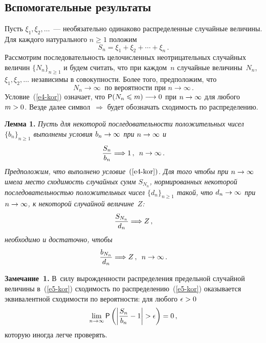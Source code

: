 \begin{multicols}{2}
\subsection{Вспомогательные результаты}

Пусть $\xi_1,\xi_2,\ldots$~--- необязательно одинаково распределенные случайные 
величины. Для каж\-до\-го натурального $n\geqslant1$ положим 
$$
S_n=\xi_1+\xi_2+\cdots+\xi_n\,.
$$ 
Рассмотрим последовательность целочисленных 
неотрицательных случайных величин $\{N_n\}_{n\geqslant1}$ и будем считать, что 
при каждом~$n$ случайные величины~$N_n$, $\xi_1,\xi_2,\ldots$ независимы в 
совокупности. Более того, предположим, что
\begin{equation}
N_n\longrightarrow \infty\ \mbox{ по вероятности при }
n\to\infty\,.\label{e4-kor}
\end{equation}
Условие~(\ref{e4-kor}) означает, что ${\sf P}(N_n\leqslant m)\hm\longrightarrow 0$ при
$n\hm\to\infty$ для любого $m\hm>0$. Везде далее символ~$\Longrightarrow$ будет 
обозначать сходимость по распределению.

\smallskip

\noindent
\textbf{Лемма 1.} \textit{Пусть для некоторой последователь\-ности положительных чисел 
$\{b_n\}_{n\geqslant1}$ выполнены условия $b_n\hm\to\infty$ при $n\hm\to\infty$ и
\begin{equation}
\displaystyle\frac{\displaystyle S_n\mathstrut}{\displaystyle b_n\mathstrut}\Longrightarrow 1\,,\enskip n\to\infty\,.\label{e5-kor}
\end{equation}
Предположим, что выполнено условие~$(\ref{e4-kor})$. Для того чтобы при $n\hm\to\infty$ имела 
место сходимость случайных сумм $S_{N_n}$, нормированных некоторой 
последовательностью положительных чисел $\{d_n\}_{n\geqslant1}$ такой, что 
$d_n\hm\to\infty$ при $n\hm\to\infty$, к некоторой случайной величине~$Z$:
\begin{equation}
\displaystyle\frac{\displaystyle S_{N_n}\mathstrut}{\displaystyle d_n\mathstrut}\Longrightarrow Z\,,\label{e6-kor}
\end{equation}
необходимо и достаточно, чтобы}
\begin{equation}
\displaystyle\frac{\displaystyle b_{N_n}\mathstrut}{\displaystyle d_n\mathstrut}\Longrightarrow Z\,,\enskip n\to\infty\,.\label{e7-kor}
\end{equation}


\smallskip

\noindent
\textbf{Замечание~1.} В~силу вырожденности распределения предельной
случайной величины в~(\ref{e5-kor}) сходимость по распределению~(\ref{e5-kor}) оказывается
эквивалентной сходимости по вероятности: для любого $\epsilon\hm>0$
$$
\lim\limits_{n\to\infty}{\sf P}\left(\left\vert \displaystyle\frac{\displaystyle S_n\mathstrut}{\displaystyle b_n\mathstrut}-1\right\vert >\epsilon\right)=0\,,
$$
которую иногда легче проверять.


\end{multicols}
